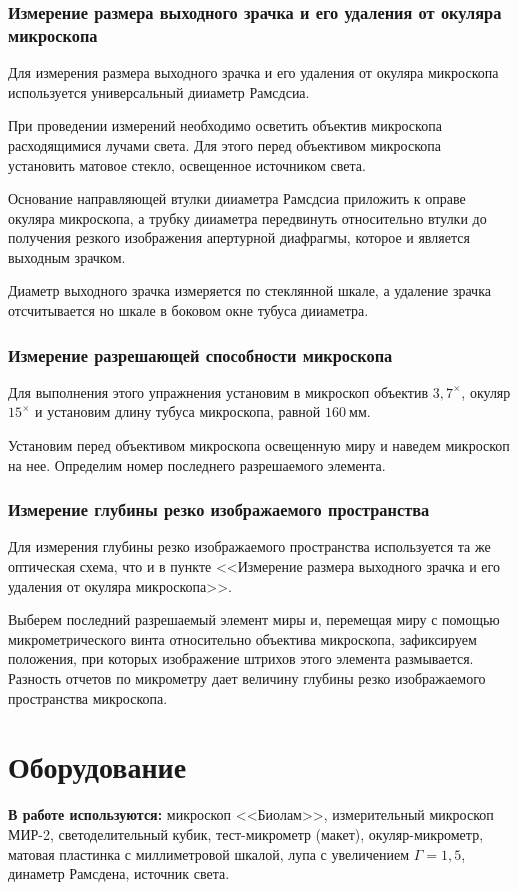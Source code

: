 \documentclass[a4paper, 12pt]{article}
\begin{document}
\subsubsection*{Измерение размера выходного зрачка и его удаления от
окуляра микроскопа}
Для измерения размера выходного зрачка и его удаления от окуляра
микроскопа используется универсальный дииаметр Рамсдсиа.

При проведении измерений необходимо осветить объектив микроскопа
расходящимися лучами света. Для этого перед объективом микроскопа
установить матовое стекло, освещенное источником света.

Основание направляющей втулки дииаметра Рамсдсиа приложить к оправе
окуляра микроскопа, а трубку дииаметра передвинуть относительно втулки
до получения резкого изображения апертурной диафрагмы, которое и
является выходным зрачком.

Диаметр выходного зрачка измеряется по стеклянной шкале, а удаление
зрачка отсчитывается но шкале в боковом окне тубуса дииаметра.


\subsubsection*{Измерение разрешающей способности микроскопа}
Для выполнения этого
упражнения установим в микроскоп объектив $3,7^\times$, окуляр
$15^\times$ и
установим длину тубуса микроскопа, равной $160\ \text{мм}$.

Установим перед объективом микроскопа освещенную миру и
наведем микроскоп на нее. Определим номер последнего разрешаемого
элемента.

\subsubsection*{Измерение глубины резко изображаемого пространства}
Для измерения глубины резко изображаемого пространства используется та
же оптическая схема, что и в пункте <<Измерение размера выходного
зрачка и его удаления от окуляра микроскопа>>.

Выберем последний разрешаемый элемент миры и, перемещая миру с помощью
микрометрического винта относительно объектива микроскопа,
зафиксируем положения, при которых изображение штрихов этого
элемента размывается. Разность отчетов по микрометру дает величину
глубины резко изображаемого пространства микроскопа.


\section{Оборудование}
\textbf{В работе используются:} микроскоп <<Биолам>>, измерительный
микроскоп МИР-2, светоделительный кубик, тест-микрометр (макет),
окуляр-микрометр, матовая пластинка с миллиметровой шкалой, лупа с
увеличением $\Gamma = 1,5$, динаметр Рамсдена, источник света. 
\end{document}
